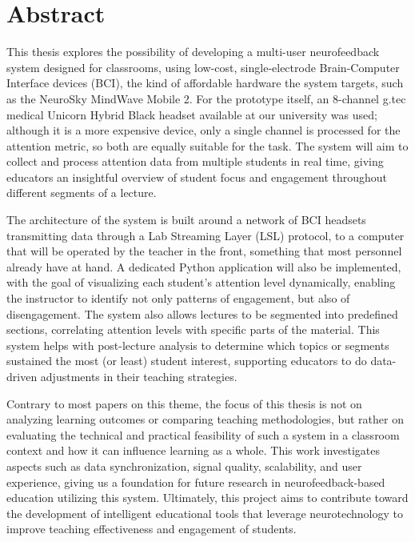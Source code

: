\newpage
\section*{Abstract}


This thesis explores the possibility of developing a multi-user neurofeedback system designed for classrooms, using low-cost, single-electrode Brain-Computer Interface devices (BCI), the kind of affordable hardware the system targets, such as the NeuroSky MindWave Mobile 2. For the prototype itself, an 8-channel g.tec medical Unicorn Hybrid Black headset available at our university was used; although it is a more expensive device, only a single channel is processed for the attention metric, so both are equally suitable for the task. The system will aim to collect and process attention data from multiple students in real time, giving educators an insightful overview of student focus and engagement throughout different segments of a lecture.


The architecture of the system is built around a network of BCI headsets transmitting data through a Lab Streaming Layer (LSL) protocol, to a computer that will be operated by the teacher in the front, something that most personnel already have at hand. A dedicated Python application will also be implemented, with the goal of visualizing each student’s attention level dynamically, enabling the instructor to identify not only patterns of engagement, but also of disengagement. The system also allows lectures to be segmented into predefined sections, correlating attention levels with specific parts of the material. This system helps with post-lecture analysis to determine which topics or segments sustained the most (or least) student interest, supporting educators to do data-driven adjustments in their teaching strategies.


Contrary to most papers on this theme, the focus of this thesis is not on analyzing learning outcomes or comparing teaching methodologies, but rather on evaluating the technical and practical feasibility of such a system in a classroom context and how it can influence learning as a whole. This work investigates aspects such as data synchronization, signal quality, scalability, and user experience, giving us a foundation for future research in neurofeedback-based education utilizing this system. Ultimately, this project aims to contribute toward the development of intelligent educational tools that leverage neurotechnology to improve teaching effectiveness and engagement of students.